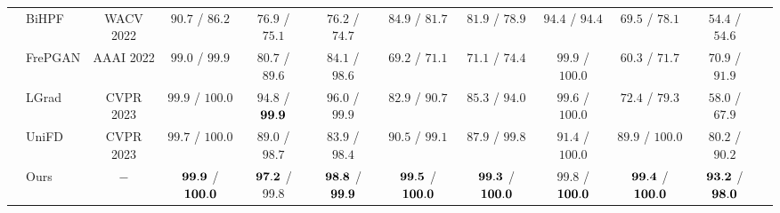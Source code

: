 \documentclass[10pt,twocolumn,letterpaper]{article}
\begin{document}
\begin{table}[!ht]
{\begin{tabular}{c|l|c|cccccccc|c}
& BiHPF \cite{jeong2022bihpf}      & WACV 2022 & $90.7$ / $86.2 $ & $76.9$ / $75.1$ & $76.2$ / $74.7$ & $84.9$ / $81.7$ & $81.9$ / $78.9$ & $94.4 $ / $94.4 $ & $69.5$ / $78.1$ & $54.4$ / $54.6$ & \cellcolor{lightgray!20}{$78.6$ / $77.9$} \\
& FrePGAN \cite{jeong2022frepgan}  & AAAI 2022 & $99.0$ / $99.9 $ & $80.7$ / $89.6$ & $84.1$ / $98.6$ & $69.2$ / $71.1$ & $71.1$ / $74.4$ & $99.9$ / $100.0$ & $60.3$ / $71.7$ & $70.9$ / $91.9$ & \cellcolor{lightgray!20}{$79.4$ / $87.2$} \\
& LGrad \cite{tan2023learning}     & CVPR 2023 & $99.9$ / $100.0$ & $94.8$ / $\bf 99.9$ & $96.0$ / $99.9$ & $82.9$ / $90.7$ & $85.3$ / $94.0$ & $99.6 $ / $100.0$ & $72.4$ / $79.3$ & $58.0$ / $67.9$ & \cellcolor{lightgray!20}{$86.1$ / $91.5$} \\
& UniFD \cite{ojha2023towards}      & CVPR 2023 & $99.7$ / $100.0$ & $89.0$ / $98.7$ & $83.9$ / $98.4$ & $90.5$ / $99.1$ & $87.9$ / $99.8$ & $91.4 $ / $100.0$ & $89.9$ / $100.0$ & $80.2$ / $90.2$ & \cellcolor{lightgray!20}{$89.1$ / $98.3$} \\
\hhline{~-----------}
& Ours                             &    $-$    & $\bf99.9$ / $\bf100.0$& $\bf97.2$ / 99.8 & $\bf98.8$ / $\bf99.9$ & $\bf99.5$ / $\bf100.0$& $\bf99.3$ / $\bf100.0$& 99.8 / $\bf100.0$& $\bf99.4$ / $\bf100.0$& $\bf93.2$ / $\bf98.0$ & \cellcolor{lightgray!20}{$\bf98.4$ / $\bf99.7$} \\
\end{tabular}}
\label{tab:table1}
\end{table}
\end{document}
